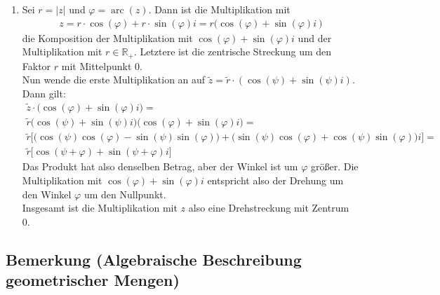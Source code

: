 \begin{enumerate}
	\item Sei $r=\vert z\vert$ und $\varphi=\operatorname{arc}(z)$. Dann ist die Multiplikation mit
	\begin{align*}
	z=r\cdot\cos(\varphi)+r\cdot\sin(\varphi)i=r\big( \cos(\varphi)+\sin(\varphi)i~\big)
	\end{align*}
	die Komposition der Multiplikation mit $\cos(\varphi)+\sin(\varphi)i$ 
	und der Multiplikation mit $r\in\mathbb{R}_+$. Letztere ist die zentrische Streckung um den Faktor $r$ mit 
	Mittelpunkt 0.\\ \newline
	Nun wende die erste Multiplikation an auf $\tilde{z}=\tilde{r}\cdot (\cos(\psi)+\sin(\psi)i)$.\\
	Dann gilt:
	\begin{equation*}\begin{gathered}
	\tilde{z}\cdot\big( \cos(\varphi)+\sin(\varphi)i \big)=\\
	\tilde{r}\big( \cos(\psi)+\sin(\psi)i \big)\big( \cos(\varphi)+\sin(\varphi)i \big)=\\
	\tilde{r}\Big[\big(\cos(\psi)\cos(\varphi)-\sin(\psi)\sin(\varphi)\big)+
	\big(\sin(\psi)\cos(\varphi)+\cos(\psi)\sin(\varphi)\big)i\Big]=\\
	\tilde{r}\Big[\cos(\psi+\varphi) + \sin(\psi+\varphi)i \Big]
	\end{gathered}\end{equation*}
	Das Produkt hat also denselben Betrag, aber der Winkel ist um $\varphi$ größer. Die Multiplikation mit 
	$\cos(\varphi)+\sin(\varphi)i$ entspricht also der Drehung um den Winkel $\varphi$ um den Nullpunkt.\\
	\newline
	Insgesamt ist die Multiplikation mit $z$ also eine Drehstreckung mit Zentrum 0.
	
	\end{enumerate}


\subsection[Algebraische Beschreibung geometrischer Mengen]{Bemerkung (Algebraische Beschreibung geometrischer Mengen)}

